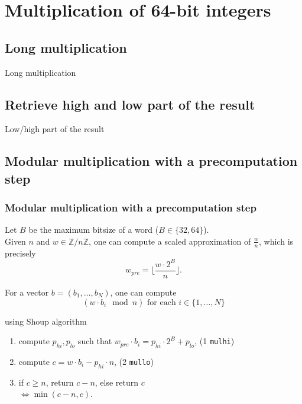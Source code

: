 \documentclass[10pt]{beamer}
\begin{document}
\section{Multiplication of 64-bit integers}
\subsection{Long multiplication}
\begin{frame}
    Long multiplication
\end{frame}

\subsection{Retrieve high and low part of the result}
\begin{frame}
    Low/high part of the result
\end{frame}

\subsection{Modular multiplication with a precomputation step}
\begin{frame}
    \frametitle{Modular multiplication with a precomputation step}

    \begin{example}
    Let $B$ be the maximum bitsize of a word ($B\in \{32, 64\}$). \\
    Given $n$ and $w \in \mathbb{Z}/n\mathbb{Z}$, one can compute a scaled approximation 
    of $\frac{w}{n}$, which is precisely $$ w_{pre} = \biggl\lfloor\dfrac{w\cdot 2^{B}}{n} \biggr\rfloor.$$
    \end{example}

    \bigskip
    For a vector $b = (b_1,\dots, b_N)$, one can compute 
    $$(w\cdot b_i \mod n) \text{ for each } i\in \{1, \dots, N\}$$

    using Shoup algorithm%

    \begin{enumerate}
        \item compute $p_{hi}, p_{lo}$ such that $w_{pre} \cdot b_i = p_{hi}\cdot 2^B + p_{lo}$, \hfill (1 \texttt{mulhi})
        \item compute $c = w\cdot b_i - p_{hi}\cdot n$, \hfill (2 \texttt{mullo})
        \item if $c \geq n$, return $c-n$, else return $c$ \\
            $\Longleftrightarrow \min(c-n, c)$.
    \end{enumerate}
\end{frame}
\end{document}
